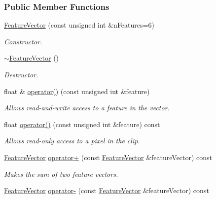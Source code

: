 \subsubsection*{Public Member Functions}
\begin{CompactItemize}
\item 
\hyperlink{class_feature_vector_bca3b0cdf84cf43d5bee90ba21a7a054}{FeatureVector} (const unsigned int \&nFeatures=6)
\begin{CompactList}\small\item\em Constructor. \item\end{CompactList}\item 
\hyperlink{class_feature_vector_1b0407e6c3a5a0154a43e138972f7ee7}{$\sim$FeatureVector} ()
\begin{CompactList}\small\item\em Destructor. \item\end{CompactList}\item 
float \& \hyperlink{class_feature_vector_40786ed7bca879e6f4dea8a396dccedf}{operator()} (const unsigned int \&feature)
\begin{CompactList}\small\item\em Allows read-and-write access to a feature in the vector. \item\end{CompactList}\item 
float \hyperlink{class_feature_vector_e5d3e313cc1080b4e17526ea938d8a74}{operator()} (const unsigned int \&feature) const 
\begin{CompactList}\small\item\em Allows read-only access to a pixel in the clip. \item\end{CompactList}\item 
\hyperlink{class_feature_vector}{FeatureVector} \hyperlink{class_feature_vector_58a2309387bd18d956e16c148585352a}{operator+} (const \hyperlink{class_feature_vector}{FeatureVector} \&featureVector) const 
\begin{CompactList}\small\item\em Makes the sum of two feature vectors. \item\end{CompactList}\item 
\hyperlink{class_feature_vector}{FeatureVector} \hyperlink{class_feature_vector_fa1a86fbb34177281854406deea435ab}{operator-} (const \hyperlink{class_feature_vector}{FeatureVector} \&featureVector) const 

\end{CompactItemize}
